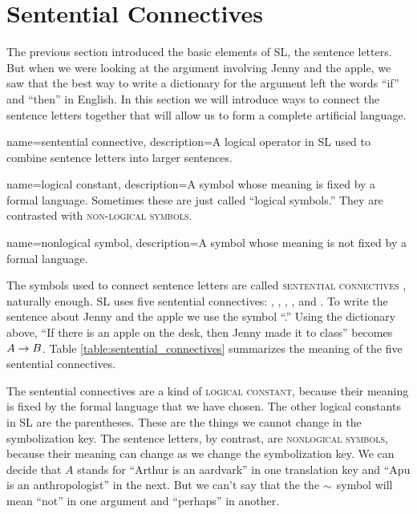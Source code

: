 \section{Sentential Connectives}


The previous section introduced the basic elements of SL, the sentence letters. But when we were looking at the argument involving Jenny and the apple, we saw that the best way to write a dictionary for the argument left the words ``if'' and ``then'' in English. In this section we will introduce ways to connect the sentence letters together that will allow us to form a complete artificial language.   

{
name=sentential connective,
description={A logical operator in SL used to combine sentence letters into larger sentences.}
}

{
name=logical constant,
description={A symbol whose meaning is fixed by a formal language. Sometimes these are just called ``logical symbols.'' They are contrasted with \textsc{non-logical symbols}.}
}

{
name=nonlogical symbol,
description={A symbol whose meaning is not fixed by a formal language.}
}

The symbols used to connect sentence letters are called \textsc{\glspl{sentential connective}} \label{def:sentential_connective}, naturally enough. SL uses five sentential connectives: \eand, \eor, \enot, \eif, and \eiff. To write the sentence about Jenny and the apple we use the symbol ``\eif.'' Using the dictionary above, ``If there is an apple on the desk, then Jenny made it to class'' becomes $A \rightarrow B$. Table \ref{table:sentential_connectives} summarizes the meaning of the five sentential connectives.

The sentential connectives are a kind of \textsc{\gls{logical constant}},\label{def:logical_constant} because their meaning is fixed by the formal language that we have chosen. The other logical constants in SL are the parentheses. These are the things we cannot change in the symbolization key. The sentence letters, by contrast, are \textsc{\glspl{nonlogical symbol}}, \label{def:nonlogical_symbol} because their meaning can change as we change the symbolization key. We can decide that $A$ stands for ``Arthur is an aardvark'' in one translation key and ``Apu is an anthropologist'' in the next. But we can't say that the  the $\mathord{\sim}$ symbol will mean ``not'' in one argument and ``perhaps'' in another.

